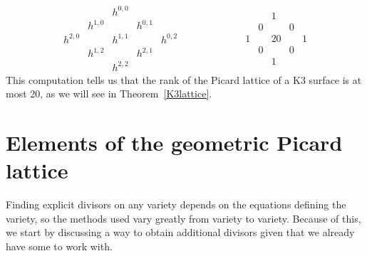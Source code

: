\documentclass[12pt,twoside]{reedthesis}
\theoremstyle{plain}
\theoremstyle{definition}
\theoremstyle{remark}
\begin{document}
\[
\begin{matrix}
& & h^{0,0} & & \\
& h^{1,0} & & h^{0,1}&\\
h^{2,0} & &h^{1,1} & & h^{0,2}\\
& h^{1,2} & & h^{2,1} &\\
& & h^{2,2} & &
\end{matrix}
\hspace{1in}
\begin{matrix}
& & 1 & & \\
& 0 & & 0 &\\
1 & & 20 & & 1\\
& 0 & & 0 &\\
& & 1 & &
\end{matrix}
\]
This computation tells us that the rank of the Picard lattice of a K3 surface is at most 20, as we will see in Theorem~\ref{K3lattice}.
\section{Elements of the geometric Picard lattice}
Finding explicit divisors on any variety depends on the equations defining the variety, so the methods used vary greatly from variety to variety. Because of this, we start by discussing a way to obtain  additional divisors given that we already have some to work with.
\end{document}
